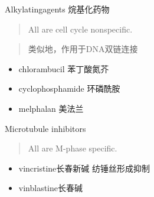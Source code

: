 \documentclass[
  ignorenonframetext,
]{beamer}
\begin{document}
\begin{frame}
\begin{block}{Alkylatingagents 烷基化药物}
\protect\hypertarget{alkylatingagents-ux70f7ux57faux5316ux836fux7269}{}
\begin{quote}
All are cell cycle nonspecific.
\end{quote}

\begin{quote}
类似地，作用于DNA双链连接
\end{quote}

\begin{itemize}
\item
  chlorambucil 苯丁酸氮芥
\item
  cyclophosphamide 环磷酰胺
\item
  melphalan 美法兰
\end{itemize}
\end{block}
\end{frame}

\begin{frame}
\begin{block}{Microtubule inhibitors}
\protect\hypertarget{microtubule-inhibitors}{}
\begin{quote}
All are M-phase specific.
\end{quote}

\begin{itemize}
\item
  vincristine长春新碱 纺锤丝形成抑制
\item
  vinblastine长春碱
\end{itemize}
\end{block}
\end{frame}
\end{document}
